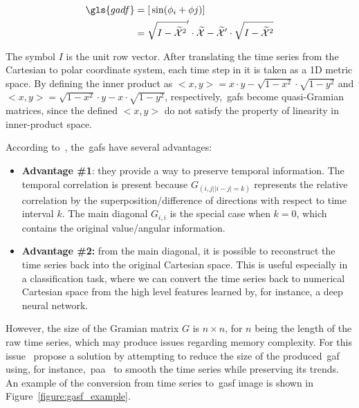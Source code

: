 \begin{equation}
    \begin{aligned}
    \gls{gadf} &= [\,\sin(\phi_{i} + \phi{j})]\, \\
    	 &= \sqrt{I-\widetilde{\mathcal{X}}^2}' \cdot \widetilde{\mathcal{X}} - \widetilde{\mathcal{X}}' \cdot \sqrt{I-\widetilde{\mathcal{X}}^2}\\
    \end{aligned}
\end{equation}

The symbol $I$ is the unit row vector. After translating the time series from the Cartesian to polar coordinate system, each time step in it is taken as a 1D metric space. By defining the inner product as $<x,y> = x \cdot y - \sqrt{1-x^2} \cdot \sqrt{1-y^2}$ and $<x,y> = \sqrt{1-x^2} \cdot y - x \cdot \sqrt{1-y^2}$, respectively,~\gls{gaf}s become {quasi-Gramian} matrices, since the defined $<x,y>$ do not satisfy the property of linearity in inner-product space.

According to~\cite{wang_imaging_2015}, the~\gls{gaf}s have several advantages:

\begin{itemize}[leftmargin=*,labelsep=5.8mm]
\item \textbf{{Advantage \#1}}: they provide a way to preserve temporal information. The temporal correlation is present because $G_{(i,j||i-j|=k)}$ represents the relative correlation by the superposition/difference of directions with respect to time interval $k$. The main diagonal $G_{i,i}$ is the special case when $k = 0$, which contains the original value/angular information. 
\item \textbf{{Advantage \#2:}} from the main diagonal, it is possible to reconstruct the time series back into the original Cartesian space. This is useful especially in a classification task, where we can convert the time series back to numerical Cartesian space from the high level features learned by, for instance, a deep neural network.
\end{itemize}

However, the size of the Gramian matrix $G$ is $n \times n$, for $n$ being the length of the raw time series, which may produce issues regarding memory complexity. For this issue~\cite{wang_imaging_2015} propose a solution by attempting to reduce the size of the produced~\gls{gaf} using, for instance,~\gls{paa}~\citep{keogh_scaling_2000} to smooth the time series while preserving its trends. An example of the conversion from time series to~\gls{gasf} image is shown in Figure~\ref{figure:gasf_example}.

